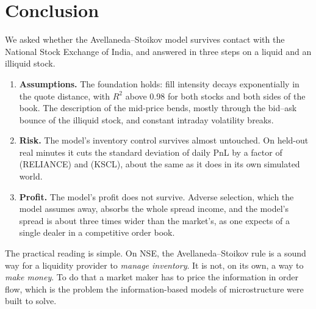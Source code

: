 \section{Conclusion}
\label{sec:conclusion}

We asked whether the Avellaneda--Stoikov model survives contact with the National Stock Exchange of
India, and answered in three steps on a liquid and an illiquid stock.

\begin{enumerate}
\item \textbf{Assumptions.} The foundation holds: fill intensity decays exponentially in the
  quote distance, with $R^2$ above 0.98 for both stocks and both sides of the book. The description
  of the mid-price bends, mostly through the bid--ask bounce of the illiquid stock, and constant
  intraday volatility breaks.
\item \textbf{Risk.} The model's inventory control survives almost untouched. On held-out real
  minutes it cuts the standard deviation of daily PnL by a factor of \RELIANCEReplaySdFactor{}
  (RELIANCE) and \KSCLReplaySdFactor{} (KSCL), about the same as it does in its own simulated world.
\item \textbf{Profit.} The model's profit does not survive. Adverse selection, which the model assumes
  away, absorbs the whole spread income, and the model's spread is about three times wider than
  the market's, as one expects of a single dealer in a competitive order book.
\end{enumerate}

\noindent The practical reading is simple. On NSE, the Avellaneda--Stoikov rule is a sound way for a
liquidity provider to \emph{manage inventory}. It is not, on its own, a way to \emph{make money}. To
do that a market maker has to price the information in order flow, which is the problem the
information-based models of microstructure were built to solve.
